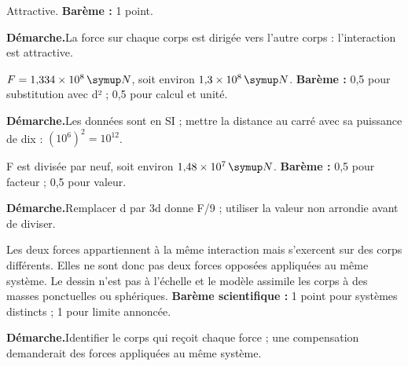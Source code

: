 \par\noindent\begin{minipage}{\linewidth}
Attractive. \textbf{Barème :} 1 point.\par
\smallskip\noindent\textbf{Démarche.}\enspace La force sur chaque corps est dirigée vers l’autre corps : l’interaction est attractive.\par
\end{minipage}\par
\par\noindent\begin{minipage}{\linewidth}
$F=1{,}334\times10^8\unite N$, soit environ $1{,}3\times10^8\unite N$. \textbf{Barème :} 0,5 pour substitution avec d² ; 0,5 pour calcul et unité.\par
\smallskip\noindent\textbf{Démarche.}\enspace Les données sont en SI ; mettre la distance au carré avec sa puissance de dix : $(10^6)^2=10^{12}$.\par
\end{minipage}\par
\par\noindent\begin{minipage}{\linewidth}
F est divisée par neuf, soit environ $1{,}48\times10^7\unite N$. \textbf{Barème :} 0,5 pour facteur ; 0,5 pour valeur.\par
\smallskip\noindent\textbf{Démarche.}\enspace Remplacer d par 3d donne F/9 ; utiliser la valeur non arrondie avant de diviser.\par
\end{minipage}\par
\par\noindent\begin{minipage}{\linewidth}
Les deux forces appartiennent à la même interaction mais s’exercent sur des corps différents. Elles ne sont donc pas deux forces opposées appliquées au même système. Le dessin n’est pas à l’échelle et le modèle assimile les corps à des masses ponctuelles ou sphériques. \textbf{Barème scientifique :} 1 point pour systèmes distincts ; 1 pour limite annoncée.\par
\smallskip\noindent\textbf{Démarche.}\enspace Identifier le corps qui reçoit chaque force ; une compensation demanderait des forces appliquées au même système.\par
{}
\end{minipage}\par
